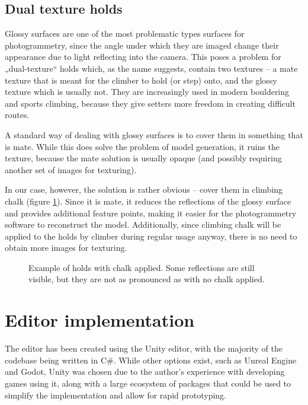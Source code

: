 \subsection{Dual texture holds}
Glossy surfaces are one of the most problematic types surfaces for photogrammetry, since the angle under which they are imaged change their appearance due to light reflecting into the camera.
This poses a problem for „dual-texture“ holds which, as the name suggests, contain two textures -- a mate texture that is meant for the climber to hold (or step) onto, and the glossy texture which is usually not.
They are increasingly used in modern bouldering and sports climbing, because they give setters more freedom in creating difficult routes.

A standard way of dealing with glossy surfaces is to cover them in something that is mate.
While this does solve the problem of model generation, it ruins the texture, because the mate solution is usually opaque (and possibly requiring another set of images for texturing).

In our case, however, the solution is rather obvious -- cover them in climbing chalk (figure \ref{fig:chalk}).
Since it is mate, it reduces the reflections of the glossy surface and provides additional feature points, making it easier for the photogrammetry software to reconstruct the model.
Additionally, since climbing chalk will be applied to the holds by climber during regular usage anyway, there is no need to obtain more images for texturing.

\begin{figure}[H]
	\centering
	\hfill
	\hfill
	\caption{Example of holds with chalk applied. Some reflections are still visible, but they are not as pronounced as with no chalk applied.}%
	\label{fig:chalk}
\end{figure}

\section{Editor implementation}
The editor has been created using the Unity editor, with the majority of the codebase being written in C\#.
While other options exist, such as Unreal Engine and Godot, Unity was chosen due to the author's experience with developing games using it, along with a large ecosystem of packages that could be used to simplify the implementation and allow for rapid prototyping.

